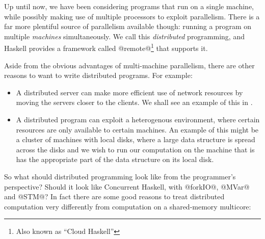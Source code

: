 
Up until now, we have been considering programs that run on a single
machine, while possibly making use of multiple processors to exploit
parallelism.  There is a far more plentiful source of parallelism
available though: running a program on multiple \emph{machines}
simultaneously.  We call this \emph{distributed} programming, and
Haskell provides a framework called @remote@\footnote{Also known as
  ``Cloud Haskell''} that supports it.

Aside from the obvious advantages of multi-machine parallelism, there
are other reasons to want to write distributed programs. For example:

\begin{itemize}
\item A distributed server can make more efficient use of network
  resources by moving the servers closer to the clients.  We shall see
  an example of this in .

\item A distributed program can exploit a heterogenous environment,
  where certain resources are only available to certain machines.  An
  example of this might be a cluster of machines with local disks,
  where a large data structure is spread across the disks and we wish
  to run our computation on the machine that is has the appropriate
  part of the data structure on its local disk.
\end{itemize}

So what should distributed programming look like from the programmer's
perspective?  Should it look like Concurrent Haskell, with @forkIO@,
@MVar@ and @STM@?  In fact there are some good reasons to treat
distributed computation very differently from computation on a
shared-memory multicore:

